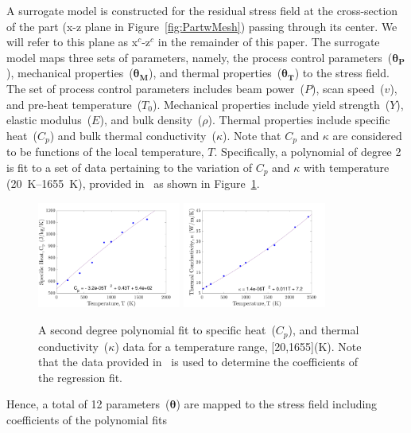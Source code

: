 A surrogate model is constructed for the residual stress field at the cross-section of the part 
(x-z plane in Figure~\ref{fig:PartwMesh}) passing through its center. We will refer to this plane
as x$^c$-z$^c$ in the remainder of this paper. The surrogate model maps three sets of
parameters, namely, the process control parameters~($\bm{\theta_P}$), mechanical properties~($\bm{\theta_M}$),
and thermal properties~($\bm{\theta_T}$) to the stress field. The set of process control parameters includes
beam power~($P$), scan speed~($v$), and pre-heat temperature~($T_0$). Mechanical properties
include yield strength~($Y$), elastic modulus~($E$), and bulk density~($\rho$). Thermal 
properties include specific heat~($C_p$) and bulk thermal conductivity~($\kappa$). Note that $C_p$ and $\kappa$
are considered to be functions of the local temperature, $T$. Specifically, a polynomial of degree 2 is fit
to a set of data pertaining to the variation of $C_p$ and $\kappa$ with temperature (20~K--1655~K), 
provided in~\cite{Fu:2014} as shown in Figure~\ref{fig:Cp_kappa}.
%
\begin{figure}[htbp]
\begin{center}
\includegraphics[width=0.42\textwidth]{./Figures/cp_fit}
\includegraphics[width=0.42\textwidth]{./Figures/kappa_fit}
\end{center}
\caption{A second degree polynomial fit to specific heat~($C_p$), and thermal conductivity~($\kappa$) data
for a temperature range, [20,1655](K). Note that the data provided in~\cite{Fu:2014} is used to determine
the coefficients of the regression fit.}
\label{fig:Cp_kappa}
\end{figure}
%
Hence, a total of 12 parameters~($\bm{\theta}$) are mapped to the stress field including coefficients of the polynomial fits

